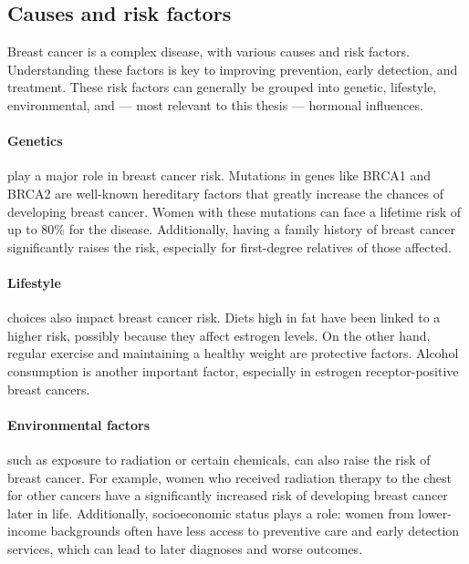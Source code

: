 \subsection{Causes and risk factors}
\label{sec:brca_risk-factors}

Breast cancer is a complex disease, with various causes and risk factors.
Understanding these factors is key to improving prevention, early detection,
and treatment.
These risk factors can generally be grouped into genetic, lifestyle,
environmental, and — most relevant to this thesis — hormonal
influences\supercite{clusan_basic_2023}.

\paragraph{Genetics} play a major role in breast cancer risk.
Mutations in genes like BRCA1 and BRCA2 are well-known hereditary factors that
greatly increase the chances of developing breast cancer.
Women with these mutations can face a lifetime risk of up to 80\% for the
disease\supercite{jian_clinical_2017}.
Additionally, having a family history of breast cancer significantly raises the
risk, especially for first-degree relatives of those
affected\supercite{schairer_risk_2013}.

\paragraph{Lifestyle} choices also impact breast cancer risk.
Diets high in fat have been linked to a higher risk, possibly because they
affect estrogen levels\supercite{turner_meta-analysis_2011}.
On the other hand, regular exercise and maintaining a healthy weight are
protective factors\supercite{claudia_admoun_etiology_2022}.
Alcohol consumption is another important factor, especially in estrogen
receptor-positive breast cancers\supercite{bao_association_2011}.

\paragraph{Environmental factors} such as exposure to radiation or certain
chemicals, can also raise the risk of breast cancer.
For example, women who received radiation therapy to the chest for other
cancers have a significantly increased risk of developing breast cancer later
in life\supercite{froes_brandao_prolactin_2016}.
Additionally, socioeconomic status plays a role: women from lower-income
backgrounds often have less access to preventive care and early detection
services, which can lead to later diagnoses and worse
outcomes\supercite{cunningham_mind_2013}.

